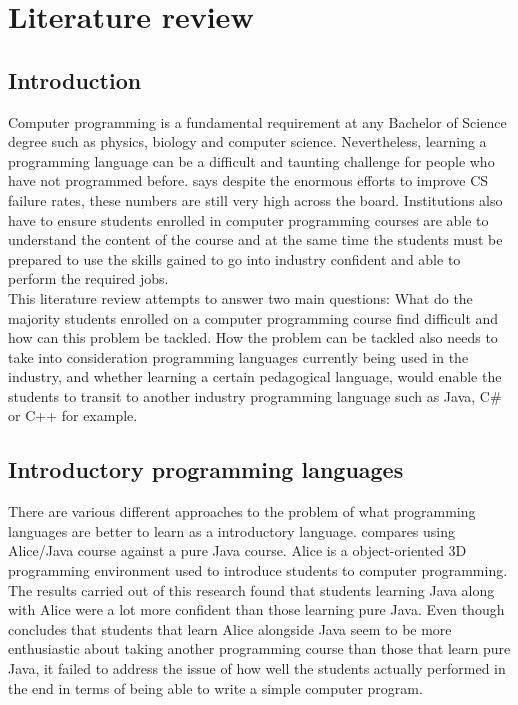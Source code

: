 \documentclass[a4paper]{article}
\begin{document}
\newpage
\section{Literature review}

\subsection{Introduction}
Computer programming is a fundamental requirement at any Bachelor of Science degree such as physics, biology and computer science. Nevertheless, learning a programming language can be a difficult and taunting challenge for people who have not programmed before. \textcite{VihavainenAiraksinenWatson2014} says despite the enormous efforts to improve CS failure rates, these numbers are still very high across the board. Institutions also have to ensure students enrolled in computer programming courses are able to understand the content of the course and at the same time the students must be prepared to use the skills gained to go into industry confident and able to perform the required jobs. \parencite{KrpanBilobrk2011}\\

This literature review attempts to answer two main questions: What do the majority students enrolled on a computer programming course find difficult and how can this problem be tackled. How the problem can be tackled also needs to take into consideration programming languages currently being used in the industry, and whether learning a certain pedagogical language, would enable the students to transit to another industry programming language such as Java, C\# or C++ for example.

\subsection{Introductory programming languages}
There are various different approaches to the problem of what programming languages are better to learn as a introductory language. \textcite{Daly2011} compares using Alice/Java course against a pure Java course. Alice is a object-oriented 3D programming environment used to introduce students to computer programming. The results carried out of this research found that students learning Java along with Alice were a lot more confident than those learning pure Java. Even though \textcite{Daly2011} concludes that students that learn Alice alongside Java seem to be more enthusiastic about taking another programming course than those that learn pure Java, it failed to address the issue of how well the students actually performed in the end in terms of being able to write a simple computer program.\\
\end{document}
